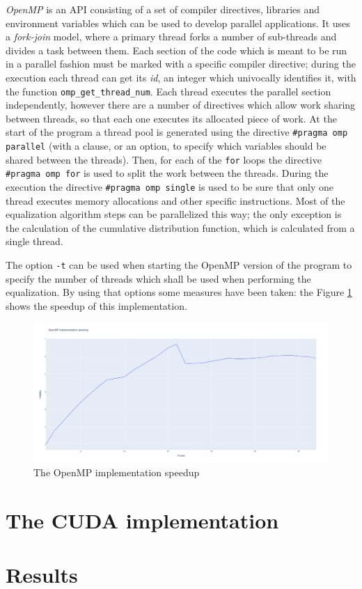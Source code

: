 \documentclass[10pt,twocolumn,letterpaper]{article}
\begin{document}
\emph{OpenMP} is an API consisting of a set of compiler directives, libraries and
environment variables which can be used to develop parallel applications. It uses
a \emph{fork-join} model, where a primary thread forks a number of sub-threads and
divides a task between them. Each section of the code which is meant to be run in
a parallel fashion must be marked with a specific compiler directive; during the
execution each thread can get its \emph{id}, an integer which univocally identifies
it, with the function \verb|omp_get_thread_num|. Each thread executes the parallel
section independently, however there are a number of directives which allow
work sharing between threads, so that each one executes its allocated piece of work.
At the start of the program a thread pool is generated using the directive
\verb|#pragma omp parallel| (with a clause, or an option, to specify which variables
should be shared between the threads). Then, for each of the \verb|for| loops the
directive \verb|#pragma omp for| is used to split the work between the threads.
During the execution the directive \verb|#pragma omp single| is used to be sure that
only one thread executes memory allocations and other specific instructions.
Most of the equalization algorithm steps can be parallelized this way; the only exception
is the calculation of the cumulative distribution function, which is calculated from
a single thread.

The option \verb|-t| can be used when starting the OpenMP version of the program
to specify the number of threads which shall be used when performing the equalization.
By using that options some measures have been taken: the Figure \ref{fig:openmp-speedup}
shows the speedup of this implementation.

\begin{figure}
\begin{center}
\includegraphics[width=1.0\linewidth]{./img/omp-speedup.png}
\end{center}
    \caption{The OpenMP implementation speedup}
\label{fig:openmp-speedup}
\end{figure}

\section{The CUDA implementation}


\section{Results}


\newpage

\nocite{*}
 

\end{document}
